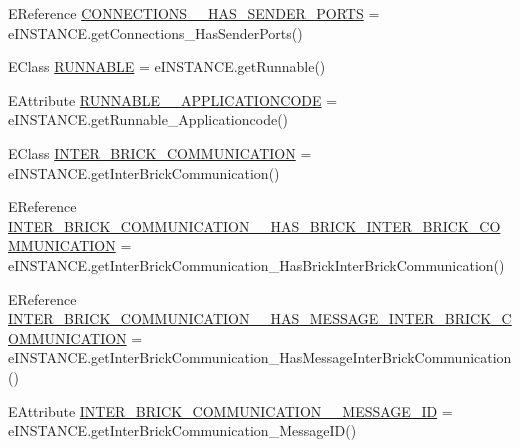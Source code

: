 \begin{DoxyCompactItemize}
\item 
E\-Reference \hyperlink{interfaceshootingmachineemfmodel_1_1_shootingmachineemfmodel_package_1_1_literals_a358f29496a0fad25e398d9a212e455a1}{C\-O\-N\-N\-E\-C\-T\-I\-O\-N\-S\-\_\-\-\_\-\-H\-A\-S\-\_\-\-S\-E\-N\-D\-E\-R\-\_\-\-P\-O\-R\-T\-S} = e\-I\-N\-S\-T\-A\-N\-C\-E.\-get\-Connections\-\_\-\-Has\-Sender\-Ports()
\item 
E\-Class \hyperlink{interfaceshootingmachineemfmodel_1_1_shootingmachineemfmodel_package_1_1_literals_adc1820eccabf58b14ef224032dd51498}{R\-U\-N\-N\-A\-B\-L\-E} = e\-I\-N\-S\-T\-A\-N\-C\-E.\-get\-Runnable()
\item 
E\-Attribute \hyperlink{interfaceshootingmachineemfmodel_1_1_shootingmachineemfmodel_package_1_1_literals_adc064ca355e28e0852dc372bece4a75c}{R\-U\-N\-N\-A\-B\-L\-E\-\_\-\-\_\-\-A\-P\-P\-L\-I\-C\-A\-T\-I\-O\-N\-C\-O\-D\-E} = e\-I\-N\-S\-T\-A\-N\-C\-E.\-get\-Runnable\-\_\-\-Applicationcode()
\item 
E\-Class \hyperlink{interfaceshootingmachineemfmodel_1_1_shootingmachineemfmodel_package_1_1_literals_a9744d5c3be118507d7e7c661b7882d4e}{I\-N\-T\-E\-R\-\_\-\-B\-R\-I\-C\-K\-\_\-\-C\-O\-M\-M\-U\-N\-I\-C\-A\-T\-I\-O\-N} = e\-I\-N\-S\-T\-A\-N\-C\-E.\-get\-Inter\-Brick\-Communication()
\item 
E\-Reference \hyperlink{interfaceshootingmachineemfmodel_1_1_shootingmachineemfmodel_package_1_1_literals_ae2037a67c79323fb6399ef6bd81e834d}{I\-N\-T\-E\-R\-\_\-\-B\-R\-I\-C\-K\-\_\-\-C\-O\-M\-M\-U\-N\-I\-C\-A\-T\-I\-O\-N\-\_\-\-\_\-\-H\-A\-S\-\_\-\-B\-R\-I\-C\-K\-\_\-\-I\-N\-T\-E\-R\-\_\-\-B\-R\-I\-C\-K\-\_\-\-C\-O\-M\-M\-U\-N\-I\-C\-A\-T\-I\-O\-N} = e\-I\-N\-S\-T\-A\-N\-C\-E.\-get\-Inter\-Brick\-Communication\-\_\-\-Has\-Brick\-Inter\-Brick\-Communication()
\item 
E\-Reference \hyperlink{interfaceshootingmachineemfmodel_1_1_shootingmachineemfmodel_package_1_1_literals_a93e2a1534438a456ec1976c3c3657bb6}{I\-N\-T\-E\-R\-\_\-\-B\-R\-I\-C\-K\-\_\-\-C\-O\-M\-M\-U\-N\-I\-C\-A\-T\-I\-O\-N\-\_\-\-\_\-\-H\-A\-S\-\_\-\-M\-E\-S\-S\-A\-G\-E\-\_\-\-I\-N\-T\-E\-R\-\_\-\-B\-R\-I\-C\-K\-\_\-\-C\-O\-M\-M\-U\-N\-I\-C\-A\-T\-I\-O\-N} = e\-I\-N\-S\-T\-A\-N\-C\-E.\-get\-Inter\-Brick\-Communication\-\_\-\-Has\-Message\-Inter\-Brick\-Communication()
\item 
E\-Attribute \hyperlink{interfaceshootingmachineemfmodel_1_1_shootingmachineemfmodel_package_1_1_literals_a7f8c5b876efa409144b3f78f77678e1a}{I\-N\-T\-E\-R\-\_\-\-B\-R\-I\-C\-K\-\_\-\-C\-O\-M\-M\-U\-N\-I\-C\-A\-T\-I\-O\-N\-\_\-\-\_\-\-M\-E\-S\-S\-A\-G\-E\-\_\-\-I\-D} = e\-I\-N\-S\-T\-A\-N\-C\-E.\-get\-Inter\-Brick\-Communication\-\_\-\-Message\-I\-D()

\end{DoxyCompactItemize}
